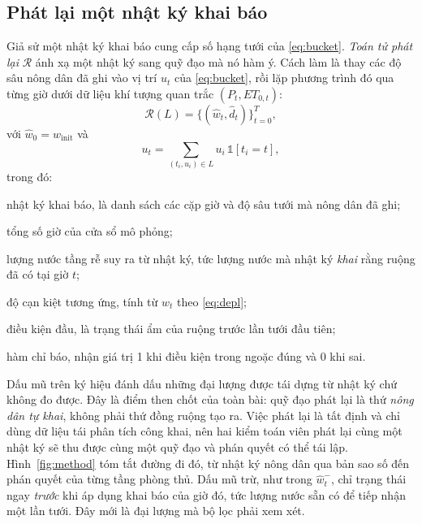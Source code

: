 \subsection{Phát lại một nhật ký khai báo}
\label{sec:replay}

Giả sử một nhật ký khai báo cung cấp số hạng tưới của \eqref{eq:bucket}.
\emph{Toán tử phát lại} $\mathcal{R}$ ánh xạ một nhật ký sang quỹ đạo mà nó hàm ý.
Cách làm là thay các độ sâu nông dân đã ghi vào vị trí $u_t$ của
\eqref{eq:bucket}, rồi lặp phương trình đó qua từng giờ dưới dữ liệu khí tượng
quan trắc $(P_t,ET_{0,t})$:
\begin{equation}
\mathcal{R}(L)=\{(\hat w_t,\hat d_t)\}_{t=0}^{T},
\label{eq:replay}
\end{equation}
với $\hat w_0=w_{\mathrm{init}}$ và
\begin{equation}
u_t=\sum_{(t_i,u_i)\in L}u_i\,\mathbb{1}[t_i=t],
\label{eq:uterm}
\end{equation}
trong đó:
\begin{symbolist}
\item[$L$] nhật ký khai báo, là danh sách các cặp giờ và độ sâu tưới mà nông dân
  đã ghi;
\item[$T$] tổng số giờ của cửa sổ mô phỏng;
\item[$\hat w_t$] lượng nước tầng rễ suy ra từ nhật ký, tức lượng nước mà nhật
  ký \emph{khai} rằng ruộng đã có tại giờ $t$;
\item[$\hat d_t$] độ cạn kiệt tương ứng, tính từ $\hat w_t$ theo
  \eqref{eq:depl};
\item[$\hat w_0=w_{\mathrm{init}}$] điều kiện đầu, là trạng thái ẩm của ruộng
  trước lần tưới đầu tiên;
\item[$\mathbb{1}\lbrack\cdot\rbrack$] hàm chỉ báo, nhận giá trị 1 khi điều kiện trong ngoặc đúng và 0 khi sai.
\end{symbolist}

Dấu mũ trên ký hiệu đánh dấu những đại lượng được tái dựng từ nhật ký chứ không
đo được. Đây là điểm then chốt của toàn bài: quỹ đạo phát lại là thứ
\emph{nông dân tự khai}, không phải thứ đồng ruộng tạo ra. Việc phát lại là tất
định và chỉ dùng dữ liệu tái phân tích công khai, nên hai kiểm toán viên phát lại
cùng một nhật ký sẽ thu được cùng một quỹ đạo và phán quyết có thể tái lập. Hình~\ref{fig:method} tóm tắt đường đi đó, từ nhật ký nông dân qua bản sao số đến phán quyết của từng tầng phòng thủ. Dấu mũ trừ, như trong $\hat w_{t}^{-}$, chỉ trạng thái ngay \emph{trước} khi áp
dụng khai báo của giờ đó, tức lượng nước sẵn có để tiếp nhận một lần tưới. Đây
mới là đại lượng mà bộ lọc phải xem xét.

